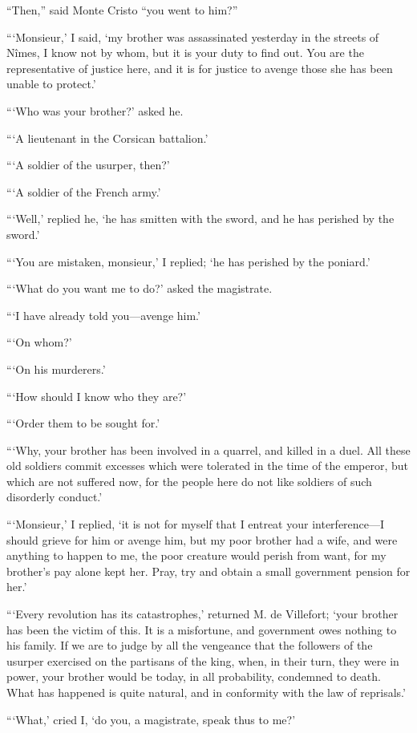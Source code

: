 “Then,” said Monte Cristo “you went to him?”

“‘Monsieur,’ I said, ‘my brother was assassinated yesterday in the
streets of Nîmes, I know not by whom, but it is your duty to find out.
You are the representative of justice here, and it is for justice to
avenge those she has been unable to protect.’

“‘Who was your brother?’ asked he.

“‘A lieutenant in the Corsican battalion.’

“‘A soldier of the usurper, then?’

“‘A soldier of the French army.’

“‘Well,’ replied he, ‘he has smitten with the sword, and he has
perished by the sword.’

“‘You are mistaken, monsieur,’ I replied; ‘he has perished by the
poniard.’

“‘What do you want me to do?’ asked the magistrate.

“‘I have already told you—avenge him.’

“‘On whom?’

“‘On his murderers.’

“‘How should I know who they are?’

“‘Order them to be sought for.’

“‘Why, your brother has been involved in a quarrel, and killed in a
duel. All these old soldiers commit excesses which were tolerated in
the time of the emperor, but which are not suffered now, for the people
here do not like soldiers of such disorderly conduct.’

“‘Monsieur,’ I replied, ‘it is not for myself that I entreat your
interference—I should grieve for him or avenge him, but my poor brother
had a wife, and were anything to happen to me, the poor creature would
perish from want, for my brother’s pay alone kept her. Pray, try and
obtain a small government pension for her.’

“‘Every revolution has its catastrophes,’ returned M. de Villefort;
‘your brother has been the victim of this. It is a misfortune, and
government owes nothing to his family. If we are to judge by all the
vengeance that the followers of the usurper exercised on the partisans
of the king, when, in their turn, they were in power, your brother
would be today, in all probability, condemned to death. What has
happened is quite natural, and in conformity with the law of
reprisals.’

“‘What,’ cried I, ‘do you, a magistrate, speak thus to me?’

